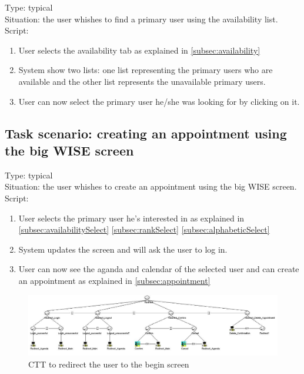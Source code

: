 \documentclass[11pt, a4paper,svglistings]{report}
\begin{document}
\label{subsec:availabilitySelect}Type: typical \\
Situation: the user whishes to find a primary user using the availability list. \\
Script:
\begin{enumerate}
\item User selects the availability tab as explained in \ref{subsec:availability}
\item System show two lists: one list representing the primary users who are available and the other list represents the unavailable primary users.
\item User can now select the primary user he/she was looking for by clicking on it.
\end{enumerate}


\subsection{Task scenario: creating an appointment using the big WISE screen}


Type: typical \\
Situation: the user whishes to create an appointment using the big WISE screen. \\
Script:
\begin{enumerate}
\item User selects the primary user he's interested in as explained in \ref{subsec:availabilitySelect} \ref{subsec:rankSelect} \ref{subsec:alphabeticSelect}
\item System updates the screen and will ask the user to log in.
\item User can now see the aganda and calendar of the selected user and can create an appointment as explained in \ref{subsec:appointment}
\end{enumerate}

\begin{figure}[H]
\centering
    \includegraphics[width=1\textwidth]{Redirect.jpg}
  \caption[Redirect CTT]{\label{fig:CreateAppointment}CTT to redirect the user to the begin screen}
\end{figure}
\end{document}
